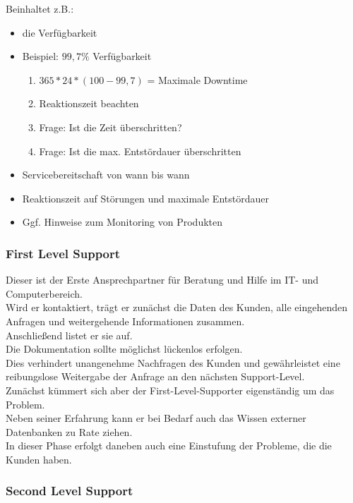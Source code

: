 \documentclass[asp1.tex]{subfiles}
\begin{document}
Beinhaltet z.B.:
\begin{itemize}

    \item die Verfügbarkeit
    \item[] Beispiel: $99,7\%$ Verfügbarkeit
          \begin{enumerate}
              \item $365 * 24 * (100-99,7)$  =  Maximale Downtime
              \item Reaktionszeit beachten
              \item Frage: Ist die Zeit überschritten?
              \item Frage: Ist die max. Entstördauer überschritten
          \end{enumerate}
    \item Servicebereitschaft von wann bis wann
    \item Reaktionszeit auf Störungen und maximale Entstördauer
    \item Ggf. Hinweise zum Monitoring von Produkten

\end{itemize}

\subsubsection{First Level Support}

Dieser ist der Erste Ansprechpartner für Beratung und Hilfe im IT- und Computerbereich. \\
Wird er kontaktiert, trägt er zunächst die Daten des Kunden, alle eingehenden Anfragen und weitergehende Informationen zusammen. \\
Anschließend listet er sie auf. \\
Die Dokumentation sollte möglichst lückenlos erfolgen. \\
Dies verhindert unangenehme Nachfragen des Kunden und gewährleistet eine reibungslose Weitergabe der Anfrage an den nächsten Support-Level.  \\
Zunächst kümmert sich aber der First-Level-Supporter eigenständig um das Problem. \\
Neben seiner Erfahrung kann er bei Bedarf auch das Wissen externer Datenbanken zu Rate ziehen. \\
In dieser Phase erfolgt daneben auch eine Einstufung der Probleme, die die Kunden haben.

\subsubsection{Second Level Support}
\end{document}
